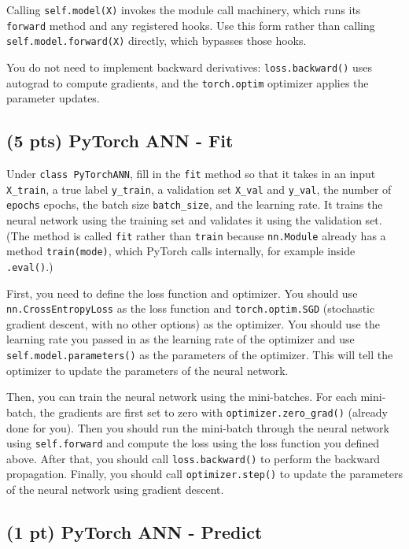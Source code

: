 \documentclass[11pt]{exam}
\begin{document}
Calling \verb|self.model(X)| invokes the module call machinery, which runs its \verb|forward| method and any registered hooks. Use this form rather than calling \verb|self.model.forward(X)| directly, which bypasses those hooks.

You do not need to implement backward derivatives: \verb|loss.backward()| uses autograd to compute gradients, and the \verb|torch.optim| optimizer applies the parameter updates.

\subsection{(5 pts) PyTorch ANN - Fit}

Under \verb|class PyTorchANN|, fill in the \verb|fit| method so that it takes in an input \verb|X_train|, a true label \verb|y_train|, a validation set \verb|X_val| and \verb|y_val|, the number of \verb|epochs| epochs, the batch size \verb|batch_size|, and the learning rate. It trains the neural network using the training set and validates it using the validation set. (The method is called \verb|fit| rather than \verb|train| because \verb|nn.Module| already has a method \verb|train(mode)|, which PyTorch calls internally, for example inside \verb|.eval()|.)

First, you need to define the loss function and optimizer. You should use \verb|nn.CrossEntropyLoss| as the loss function and \verb|torch.optim.SGD| (stochastic gradient descent, with no other options) as the optimizer. You should use the learning rate you passed in as the learning rate of the optimizer and use \verb|self.model.parameters()| as the parameters of the optimizer. This will tell the optimizer to update the parameters of the neural network.

Then, you can train the neural network using the mini-batches. For each mini-batch, the gradients are first set to zero with \verb|optimizer.zero_grad()| (already done for you). Then you should run the mini-batch through the neural network using \verb|self.forward| and compute the loss using the loss function you defined above. After that, you should call \verb|loss.backward()| to perform the backward propagation. Finally, you should call \verb|optimizer.step()| to update the parameters of the neural network using gradient descent.

\subsection{(1 pt) PyTorch ANN - Predict}
\end{document}
